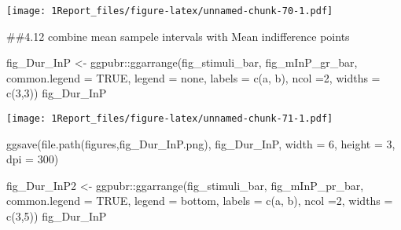 \documentclass[
]{article}
\newenvironment{Shaded}{\begin{snugshade}}{\end{snugshade}}
\newcommand{\AttributeTok}[1]{\textcolor[rgb]{0.77,0.63,0.00}{#1}}
\newcommand{\ConstantTok}[1]{\textcolor[rgb]{0.00,0.00,0.00}{#1}}
\newcommand{\DecValTok}[1]{\textcolor[rgb]{0.00,0.00,0.81}{#1}}
\newcommand{\FunctionTok}[1]{\textcolor[rgb]{0.00,0.00,0.00}{#1}}
\newcommand{\NormalTok}[1]{#1}
\newcommand{\OtherTok}[1]{\textcolor[rgb]{0.56,0.35,0.01}{#1}}
\newcommand{\SpecialCharTok}[1]{\textcolor[rgb]{0.00,0.00,0.00}{#1}}
\newcommand{\StringTok}[1]{\textcolor[rgb]{0.31,0.60,0.02}{#1}}
\begin{document}
\texttt{[image: 1Report\_files/figure-latex/unnamed-chunk-70-1.pdf]}

\#\#4.12 combine mean sampele intervals with Mean indifference points

\begin{Shaded}
\begin{Highlighting}[]
\NormalTok{fig\_Dur\_InP }\OtherTok{\textless{}{-}}\NormalTok{ ggpubr}\SpecialCharTok{::}\FunctionTok{ggarrange}\NormalTok{(fig\_stimuli\_bar, fig\_mInP\_gr\_bar,  }\AttributeTok{common.legend =} \ConstantTok{TRUE}\NormalTok{, }\AttributeTok{legend =} \StringTok{\textquotesingle{}none\textquotesingle{}}\NormalTok{, }\AttributeTok{labels =} \FunctionTok{c}\NormalTok{(}\StringTok{\textquotesingle{}a\textquotesingle{}}\NormalTok{, }\StringTok{\textquotesingle{}b\textquotesingle{}}\NormalTok{), }\AttributeTok{ncol =}\DecValTok{2}\NormalTok{, }\AttributeTok{widths =} \FunctionTok{c}\NormalTok{(}\DecValTok{3}\NormalTok{,}\DecValTok{3}\NormalTok{))}
\NormalTok{fig\_Dur\_InP}
\end{Highlighting}
\end{Shaded}

\texttt{[image: 1Report\_files/figure-latex/unnamed-chunk-71-1.pdf]}

\begin{Shaded}
\begin{Highlighting}[]
\FunctionTok{ggsave}\NormalTok{(}\FunctionTok{file.path}\NormalTok{(}\StringTok{\textquotesingle{}figures\textquotesingle{}}\NormalTok{,}\StringTok{\textquotesingle{}fig\_Dur\_InP.png\textquotesingle{}}\NormalTok{), fig\_Dur\_InP, }\AttributeTok{width =} \DecValTok{6}\NormalTok{, }\AttributeTok{height =} \DecValTok{3}\NormalTok{, }\AttributeTok{dpi =} \DecValTok{300}\NormalTok{)}
\end{Highlighting}
\end{Shaded}

\begin{Shaded}
\begin{Highlighting}[]
\NormalTok{fig\_Dur\_InP2 }\OtherTok{\textless{}{-}}\NormalTok{ ggpubr}\SpecialCharTok{::}\FunctionTok{ggarrange}\NormalTok{(fig\_stimuli\_bar, fig\_mInP\_pr\_bar,  }\AttributeTok{common.legend =} \ConstantTok{TRUE}\NormalTok{, }\AttributeTok{legend =} \StringTok{\textquotesingle{}bottom\textquotesingle{}}\NormalTok{, }\AttributeTok{labels =} \FunctionTok{c}\NormalTok{(}\StringTok{\textquotesingle{}a\textquotesingle{}}\NormalTok{, }\StringTok{\textquotesingle{}b\textquotesingle{}}\NormalTok{), }\AttributeTok{ncol =}\DecValTok{2}\NormalTok{, }\AttributeTok{widths =} \FunctionTok{c}\NormalTok{(}\DecValTok{3}\NormalTok{,}\DecValTok{5}\NormalTok{))}
\NormalTok{fig\_Dur\_InP}
\end{Highlighting}
\end{Shaded}
\end{document}
